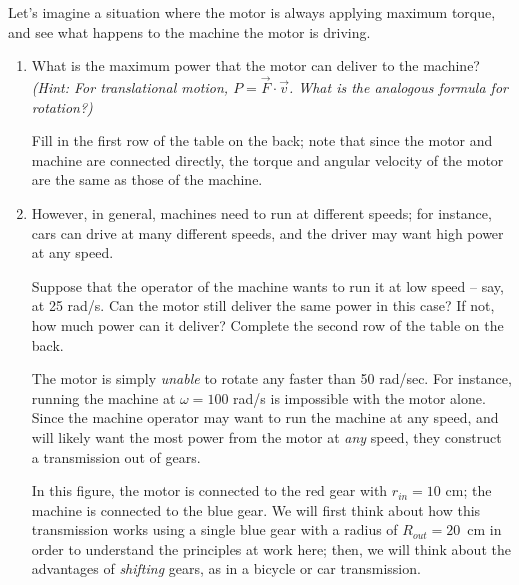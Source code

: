 \documentclass[12pt]{article}
\begin{document}
Let's imagine a situation where the motor is always applying maximum torque, and see what happens to the machine the motor is driving.

\bigskip
\newpage


\begin{enumerate}

\item What is the maximum power that the motor can deliver to the machine? \textit{(Hint: For translational motion, $P = \vec F \cdot \vec v$. What is the analogous formula for rotation?)} 

Fill in the first row of the table on the back; note that since the motor and machine are connected directly, the torque and angular velocity of the motor are the same as those of the machine.
	
	
\vspace{0.8in}
\item However, in general, machines need to run at different speeds; for instance, cars can drive at many different speeds, and 
	the driver may want high power at any speed.

		Suppose that the operator of the machine wants to run it at low speed -- say, at 25 rad/s. Can the motor still deliver the same power in this case? If not, how much power can it deliver? Complete the second row of the table on the back.
	
\vspace{1.5in}
\newpage



The motor is simply {\it unable} to rotate any faster than 50 rad/sec. For instance, running the machine at $\omega = 100$ rad/s is impossible with the motor alone. Since the machine operator may want to run the machine at any speed, and will likely want the most power from the motor at {\it any} speed, they construct a transmission out of gears.
\medskip

\begin{minipage}{0.4\textwidth}
	
	In this figure, the motor is connected to the red gear with $r_{in}=10$ cm; the machine is connected to the blue gear. We will first think about how this transmission works using
	a single blue gear with a radius of $R_{out}=20$~cm in order to understand the principles at work here; then, we will think about the advantages of {\it shifting} gears,
	as in a bicycle or car transmission.
	

\end{minipage}
\end{enumerate}
\end{document}
